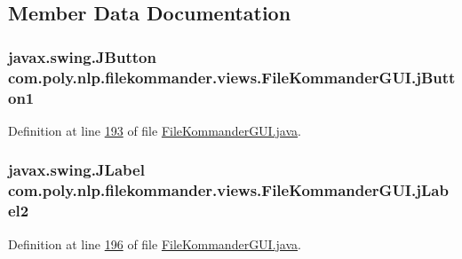 \subsection{Member Data Documentation}
\hypertarget{classcom_1_1poly_1_1nlp_1_1filekommander_1_1views_1_1_file_kommander_g_u_i_a7fdc3f53573570f3f345be50e76a0f53}{
\subsubsection[{j\-Button1}]{\setlength{\rightskip}{0pt plus 5cm}javax.\-swing.\-J\-Button com.\-poly.\-nlp.\-filekommander.\-views.\-File\-Kommander\-G\-U\-I.\-j\-Button1\hspace{0.3cm}{\ttfamily [private]}}}\label{classcom_1_1poly_1_1nlp_1_1filekommander_1_1views_1_1_file_kommander_g_u_i_a7fdc3f53573570f3f345be50e76a0f53}


Definition at line \hyperlink{L193}{193} of file \hyperlink{}{File\-Kommander\-G\-U\-I.\-java}.

\hypertarget{classcom_1_1poly_1_1nlp_1_1filekommander_1_1views_1_1_file_kommander_g_u_i_abc00d454e82d9d65d52df7063d61fe99}{
\subsubsection[{j\-Label2}]{\setlength{\rightskip}{0pt plus 5cm}javax.\-swing.\-J\-Label com.\-poly.\-nlp.\-filekommander.\-views.\-File\-Kommander\-G\-U\-I.\-j\-Label2\hspace{0.3cm}{\ttfamily [private]}}}\label{classcom_1_1poly_1_1nlp_1_1filekommander_1_1views_1_1_file_kommander_g_u_i_abc00d454e82d9d65d52df7063d61fe99}


Definition at line \hyperlink{L196}{196} of file \hyperlink{}{File\-Kommander\-G\-U\-I.\-java}.


